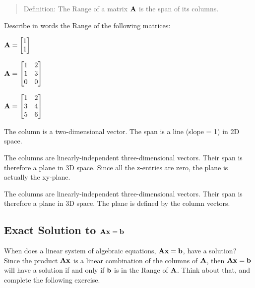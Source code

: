 \begin{quote}
Definition: The Range of a matrix $\mathbf{A}$ is the span of its columns. 
\end{quote}

\begin{prob}
Describe in words the Range of the following matrices:
\be 
\item $\mathbf{A} = \begin{bmatrix} 1 \\ 1 \end{bmatrix}$
\item $\mathbf{A} = \begin{bmatrix} 1 & 2 \\ 1 & 3 \\ 0 & 0 \end{bmatrix}$
\item $\mathbf{A} = \begin{bmatrix} 1 & 2 \\ 3 & 4 \\ 5 & 6 \end{bmatrix}$
\ee
\end{prob}

\begin{sol}
\be
\item The column is a two-dimensional vector. The span is a line (slope = 1) in 2D space. 
\item The columns are linearly-independent three-dimensional vectors. Their span is therefore a plane in 3D space. Since all the z-entries are zero, the plane is actually the xy-plane.
\item The columns are linearly-independent three-dimensional vectors. Their span is therefore a plane in 3D space. The plane is defined by the column vectors.
\ee
\end{sol}

\subsection{Exact Solution to $\mathbf{A} \mathbf{x} = \mathbf{b}$}

When does a linear system of algebraic equations, $\mathbf{A} \mathbf{x} = \mathbf{b}$, have a solution? Since the product $\mathbf{A} \mathbf{x}$ is a linear combination of the columns of $\mathbf{A}$, then $\mathbf{A} \mathbf{x} = \mathbf{b}$ will have a solution if and only if $\mathbf{b}$ is in the Range of $\mathbf{A}$. Think about that, and complete the following exercise.

